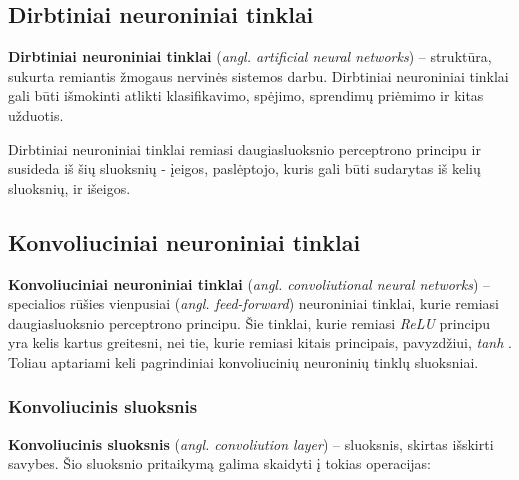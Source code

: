\documentclass{VUMIFPSbakalaurinis}
\begin{document}
\subsection{Dirbtiniai neuroniniai tinklai}
\textbf{Dirbtiniai neuroniniai tinklai} (\textit{angl. artificial neural networks}) – struktūra, sukurta remiantis žmogaus nervinės sistemos darbu. Dirbtiniai neuroniniai tinklai gali būti išmokinti atlikti klasifikavimo, spėjimo, sprendimų priėmimo ir kitas užduotis.


Dirbtiniai neuroniniai tinklai remiasi daugiasluoksnio perceptrono principu ir susideda iš šių sluoksnių - įeigos, paslėptojo, kuris gali būti sudarytas iš kelių sluoksnių, ir išeigos.






\subsection{Konvoliuciniai neuroniniai tinklai}

\textbf{Konvoliuciniai neuroniniai tinklai} (\textit{angl. convoliutional neural networks}) – specialios rūšies vienpusiai (\textit{angl. feed-forward}) neuroniniai tinklai, kurie remiasi daugiasluoksnio perceptrono principu. Šie tinklai, kurie remiasi \textit{ReLU} principu yra kelis kartus greitesni, nei tie, kurie remiasi kitais principais, pavyzdžiui, \textit{tanh} \cite{NIPS2012_4824}. Toliau aptariami keli pagrindiniai konvoliucinių neuroninių tinklų sluoksniai.

\subsubsection{Konvoliucinis sluoksnis}

\textbf{Konvoliucinis sluoksnis} (\textit{angl. convoliution layer}) – sluoksnis, skirtas išskirti savybes. Šio sluoksnio 
pritaikymą galima skaidyti į tokias operacijas:
\end{document}
